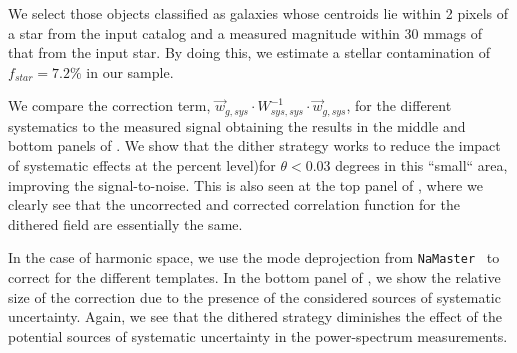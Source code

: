 \documentclass[twocolumn]{aastex62}
\begin{document}
We select those objects classified as galaxies whose centroids lie within 2 pixels of a star from the input catalog and a measured magnitude within 30 mmags of that from the input star. By doing this, we estimate a stellar contamination of $f_{star}=7.2\%$ in our sample.

We compare the correction term, $\vec{w}_{g,sys} \cdot W_{sys,sys}^{-1} \cdot \vec{w}_{g,sys}$, for the different systematics to the measured signal obtaining the results in the middle and bottom panels of . We show that the dither strategy works to reduce the impact of systematic effects at the percent level)for $\theta < 0.03$ degrees in this ``small`` area, improving the signal-to-noise. This is also seen at the top panel of , where we clearly see that the uncorrected and corrected correlation function for the dithered field are essentially the same.



In the case of harmonic space, we use the mode deprojection from \texttt{NaMaster}~\citep{Namaster} to correct for the different templates. In the bottom panel of , we show the relative size of the correction due to the presence of the considered sources of systematic uncertainty. Again, we see that the dithered strategy diminishes the effect of the potential sources of systematic uncertainty in the power-spectrum measurements.



\end{document}
